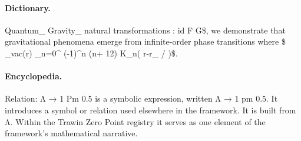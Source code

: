 \paragraph{Dictionary.}
Quantum\_ Gravity\_ natural transformations : id F G\$, we demonstrate that gravitational phenomena emerge from infinite-order phase transitions where \$ \_vac(r) \_n=0\textasciicircum{} (-1)\textasciicircum{}n (n+ 12) K\_n( r-r\_ / )\$.

\paragraph{Encyclopedia.}
Relation: Λ → 1 Pm 0.5 is a symbolic expression, written Λ → 1 pm 0.5. It introduces a symbol or relation used elsewhere in the framework. It is built from Λ. Within the Trawin Zero Point registry it serves as one element of the framework's mathematical narrative.

